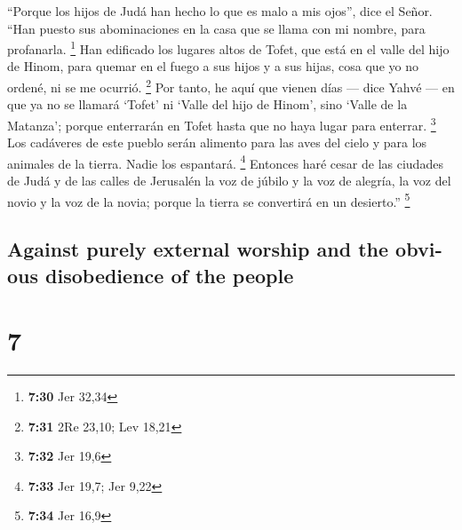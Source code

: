 \begin{paracol}{2}
 ``Porque los hijos de Judá han hecho lo que es malo a
mis ojos'', dice el Señor. ``Han puesto sus abominaciones en la casa que
se llama con mi nombre, para profanarla. \footnote{\textbf{7:30} Jer
  32,34}  Han edificado los lugares altos de Tofet, que
está en el valle del hijo de Hinom, para quemar en el fuego a sus hijos
y a sus hijas, cosa que yo no ordené, ni se me ocurrió. \footnote{\textbf{7:31}
  2Re 23,10; Lev 18,21}  Por tanto, he aquí que vienen
días --- dice Yahvé --- en que ya no se llamará `Tofet' ni `Valle del
hijo de Hinom', sino `Valle de la Matanza'; porque enterrarán en Tofet
hasta que no haya lugar para enterrar. \footnote{\textbf{7:32} Jer 19,6}
 Los cadáveres de este pueblo serán alimento para las
aves del cielo y para los animales de la tierra. Nadie los espantará.
\footnote{\textbf{7:33} Jer 19,7; Jer 9,22}  Entonces
haré cesar de las ciudades de Judá y de las calles de Jerusalén la voz
de júbilo y la voz de alegría, la voz del novio y la voz de la novia;
porque la tierra se convertirá en un desierto.'' \footnote{\textbf{7:34}
  Jer 16,9}

\switchcolumn
\begin{otherlanguage}{english}

\hypertarget{against-purely-external-worship-and-the-obvious-disobedience-of-the-people}{%
\subsection{Against purely external worship and the obvious disobedience
of the
people}\label{against-purely-external-worship-and-the-obvious-disobedience-of-the-people}}

\hypertarget{section-13}{%
\section{7}\label{section-13}}


\end{otherlanguage}
\end{paracol}
